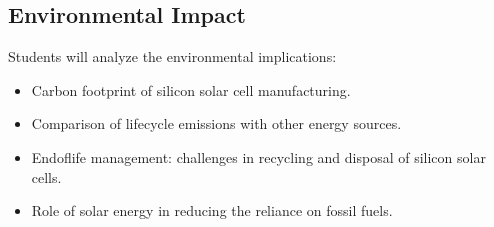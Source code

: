 \documentclass[letterpaper,10pt,english]{jupyterBook}
\begin{document}
\subsection{Environmental Impact}
\label{\detokenize{ProjectInstructions:environmental-impact}}
\sphinxAtStartPar
Students will analyze the environmental implications:
\begin{itemize}
\item {} 
\sphinxAtStartPar
Carbon footprint of silicon solar cell manufacturing.

\item {} 
\sphinxAtStartPar
Comparison of lifecycle emissions with other energy sources.

\item {} 
\sphinxAtStartPar
End\sphinxhyphen{}of\sphinxhyphen{}life management: challenges in recycling and disposal of
silicon solar cells.

\item {} 
\sphinxAtStartPar
Role of solar energy in reducing the reliance on fossil fuels.

\end{itemize}
\end{document}
